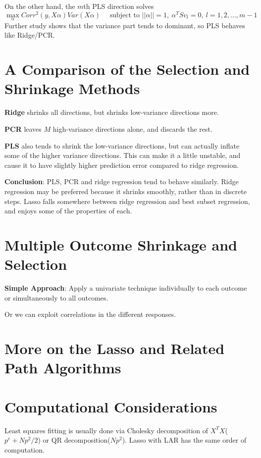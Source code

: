 On the other hand, the $m$th PLS direction solves
\begin{equation*}
\max_\alpha Corr^2(y,X\alpha)Var(X\alpha) \quad\text{ subject to } 
||\alpha||=1,~\alpha^TSv_l=0,~l=1,2,...,m-1
\end{equation*}
Further study shows that the variance part tends to dominant, so PLS behaves like 
Ridge/PCR. 

\section{A Comparison of the Selection and Shrinkage Methods}
\textbf{Ridge} shrinks all directions, but shrinks low-variance directions more. 

\textbf{PCR} leaves $M$ high-variance directions alone, and discards the rest. 

\textbf{PLS} also tends to shrink the low-variance
directions, but can actually inflate some of the higher variance directions.
This can make it a little unstable, and cause it to have slightly higher
prediction error compared to ridge regression.

\textbf{Conclusion}: PLS, PCR and ridge regression tend to behave similarly.
Ridge regression may be preferred because it shrinks smoothly, rather than
in discrete steps. Lasso falls somewhere between ridge regression and best
subset regression, and enjoys some of the properties of each.

\section{Multiple Outcome Shrinkage and Selection}
\textbf{Simple Approach}: Apply a univariate technique individually to each outcome 
or simultaneously to all outcomes. 

Or we can exploit correlations in the different responses. 

\section{More on the Lasso and Related Path Algorithms}


\section{Computational Considerations}
Least squares fitting is usually done via Cholesky decomposition of $X^TX$($p^e+Np^2/2$)
or QR decomposition($Np^2$). Lasso with LAR has the same order of computation. 